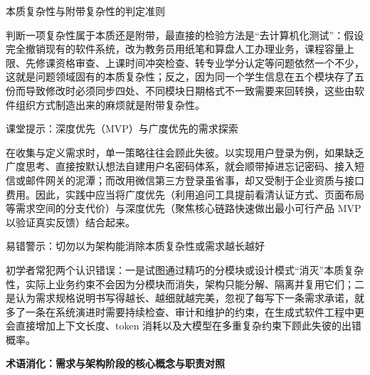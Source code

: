 \documentclass[UTF8,a4paper,11pt,fontset=fandol]{ctexart}
\begin{document}
\begin{importantbox}{本质复杂性与附带复杂性的判定准则}

判断一项复杂性属于本质还是附带，最直接的检验方法是“去计算机化测试”：假设完全撤销现有的软件系统，改为教务员用纸笔和算盘人工办理业务，课程容量上限、先修课资格审查、上课时间冲突检查、转专业学分认定等问题依然一个不少，这就是问题领域固有的本质复杂性；反之，因为同一个学生信息在五个模块存了五份而导致修改时必须同步四处、不同模块日期格式不一致需要来回转换，这些由软件组织方式制造出来的麻烦就是附带复杂性。

\end{importantbox}

\begin{knowledgebox}{课堂提示：深度优先（MVP）与广度优先的需求探索}

在收集与定义需求时，单一策略往往会顾此失彼。以实现用户登录为例，如果缺乏广度思考、直接按默认想法自建用户名密码体系，就会顺带掉进忘记密码、接入短信或邮件网关的泥潭；而改用微信第三方登录虽省事，却又受制于企业资质与接口费用。因此，实践中应当将广度优先（利用追问工具提前看清认证方式、页面布局等需求空间的分支代价）与深度优先（聚焦核心链路快速做出最小可行产品 MVP 以验证真实反馈）结合起来。

\end{knowledgebox}

\begin{warningbox}{易错警示：切勿以为架构能消除本质复杂性或需求越长越好}

初学者常犯两个认识错误：一是试图通过精巧的分模块或设计模式“消灭”本质复杂性，实际上业务约束不会因为分模块而消失，架构只能分解、隔离并复用它们；二是认为需求规格说明书写得越长、越细就越完美，忽视了每写下一条需求承诺，就多了一条在系统演进时需要持续检查、审计和维护的约束，在生成式软件工程中更会直接增加上下文长度、token 消耗以及大模型在多重复杂约束下顾此失彼的出错概率。

\end{warningbox}

\par{}\textbf{术语消化：需求与架构阶段的核心概念与职责对照}
\end{document}

